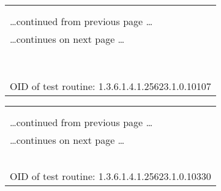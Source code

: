 \documentclass{article}
\begin{document}
\begin{longtable}{|p{}|}
\hline
\rowcolor{openvas_log}{\color{white}{Log (CVSS: 0.0) }}\\
\rowcolor{openvas_log}{\color{white}{NVT: HTTP Server type and version}}\\
\hline
\endfirsthead
\hfill\ldots continued from previous page \ldots \\
\hline
\endhead
\hline
\ldots continues on next page \ldots \\
\endfoot
\hline
\endlastfoot
\\
\rowcolor{white}{\verb=The remote web server type is :=}\\
\rowcolor{white}{\verb=Apache/2.2.14 (Ubuntu) =}\\
\rowcolor{white}{\verb=Solution : You can set the directive 'ServerTokens Prod' to limit=}\\
\rowcolor{white}{\verb=the information emanating from the server in its response headers.=}\\
\rowcolor{white}{\verb==}\\
\rowcolor{white}{\verb==}\\
\\
OID of test routine: 1.3.6.1.4.1.25623.1.0.10107\\
\end{longtable}

\begin{longtable}{|p{}|}
\hline
\rowcolor{openvas_log}{\color{white}{Log (CVSS: 0.0) }}\\
\rowcolor{openvas_log}{\color{white}{NVT: Services}}\\
\hline
\endfirsthead
\hfill\ldots continued from previous page \ldots \\
\hline
\endhead
\hline
\ldots continues on next page \ldots \\
\endfoot
\hline
\endlastfoot
\\
\rowcolor{white}{\verb=A web server is running on this port=}\\
\rowcolor{white}{\verb==}\\
\rowcolor{white}{\verb==}\\
\\
OID of test routine: 1.3.6.1.4.1.25623.1.0.10330\\
\end{longtable}
\end{document}
